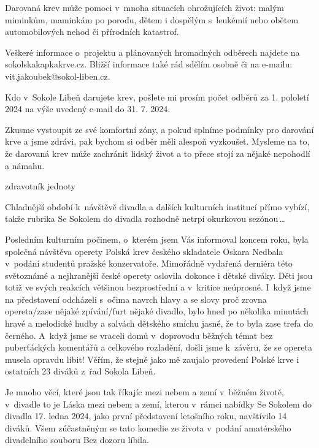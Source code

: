 \documentclass[11pt]{article}
\begin{document}
Darovaná krev může pomoci v~mnoha situacích ohrožujících život: malým miminkům, maminkám po porodu, dětem i dospělým s~leukémií nebo obětem automobilových nehod či přírodních katastrof.

Veškeré informace o~projektu a plánovaných hromadných odběrech najdete na sokolskakapkakrve.cz.
Bližší informace také rád sdělím osobně či na e-mailu: vit.jakoubek@sokol-liben.cz.

Kdo v~Sokole Libeň darujete krev, pošlete mi prosím počet odběrů za 1. pololetí 2024 na výše uvedený e-mail do 31. 7. 2024.

Zkusme vystoupit ze své komfortní zóny, a pokud splníme podmínky pro darování krve a jsme zdrávi, pak bychom si odběr měli alespoň vyzkoušet. Mysleme na to, že darovaná krev může zachránit lidský život a to přece stojí za nějaké nepohodlí a námahu. 

\signature{Vít Jakoubek}{zdravotník jednoty}

\vspace*{24pt}

Chladnější období k~návštěvě divadla a dalších kulturních institucí přímo vybízí, takže rubrika \luv{}Se Sokolem do divadla\ruv{} rozhodně netrpí okurkovou sezónou\,\dots{}

Posledním kulturním počinem, o~kterém jsem Vás informoval koncem roku, byla společná návštěva operety Polská krev českého skladatele Oskara Nedbala v~podání studentů pražské konzervatoře. Mimořádně vydařená derniéra této světoznámé a nejhranější české operety oslovila dokonce i dětské diváky. Děti jsou totiž ve svých reakcích většinou bezprostřední a v~kritice neúprosné. I~když jsme na představení odcházeli s~očima navrch hlavy a se slovy \luv{}proč zrovna opereta/zase nějaké zpívání/furt nějaké divadlo\ruv{}, bylo hned po několika minutách hravé a melodické hudby a salvách dětského smíchu jasné, že to byla \luv{}zase trefa do černého\ruv{}. A~když jsme se vraceli domů v~doprovodu běžných témat \luv{}bez puberťáckých komentářů a celkového rozladění\ruv{}, došli jsme k~závěru, že se opereta musela opravdu líbit! Věřím, že stejně jako mě zaujalo provedení Polské krve i ostatních 23 diváků z~řad Sokola Libeň.

Je mnoho věcí, které jsou tak říkajíc \luv{}mezi nebem a zemí\ruv{} v~běžném životě, v~divadle to je \luv{}Láska mezi nebem a zemí\ruv{}, kterou v~rámci nabídky \luv{}Se Sokolem do divadla\ruv{} 17. ledna 2024, jako první představení letošního roku, navštívilo 14 diváků. Všem zúčastněným se tato komedie \luv{}ze života\ruv{} v~podání amatérského divadelního souboru Bez dozoru líbila.
\end{document}

